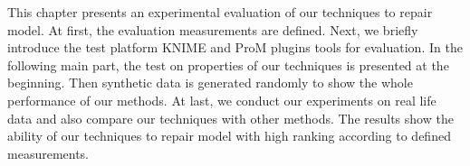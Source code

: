This chapter presents an experimental evaluation of our techniques to repair model. At first, the evaluation measurements are defined. Next, we briefly introduce the test platform KNIME and ProM plugins tools for evaluation. In the following main part, the test on properties of our techniques is presented at the beginning. Then synthetic data is generated randomly to show the whole performance of our methods. At last, we conduct our experiments on real life data and also compare our techniques with other methods. The results show the ability of our techniques to repair model with high ranking according to defined measurements.

